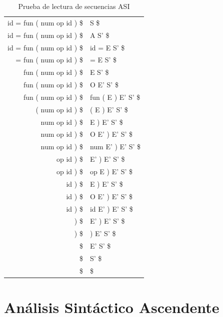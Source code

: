 \documentclass[12pt, twoside, openright]{report} %
\begin{document}
\begin{enumerate}
	      \begin{table}[H]
		      \centering
		      \begin{tabular}{r|l}
			      id = fun ( num op id ) \$ & S \$               \\
			      id = fun ( num op id ) \$ & A S' \$            \\
			      id = fun ( num op id ) \$ & id = E S' \$       \\
			      = fun ( num op id ) \$    & = E S' \$          \\
			      fun ( num op id ) \$      & E S' \$            \\
			      fun ( num op id ) \$      & O E' S' \$         \\
			      fun ( num op id ) \$      & fun ( E ) E' S' \$ \\
			      ( num op id ) \$          & ( E ) E' S' \$     \\
			      num op id ) \$            & E ) E' S' \$       \\
			      num op id ) \$            & O E' ) E' S' \$    \\
			      num op id ) \$            & num E' ) E' S' \$  \\
			      op id ) \$                & E' ) E' S' \$      \\
			      op id ) \$                & op E ) E' S' \$    \\
			      id ) \$                   & E ) E' S' \$       \\
			      id ) \$                   & O E' ) E' S' \$    \\
			      id ) \$                   & id E' ) E' S' \$   \\
			      ) \$                      & E' ) E' S' \$      \\
			      ) \$                      & ) E' S' \$         \\
			      \$                        & E' S' \$           \\
			      \$                        & S' \$              \\
			      \$                        & \$
		      \end{tabular}
		      \caption{Prueba de lectura de secuencias ASI}
	      \end{table}

\end{enumerate}
\pagebreak
\section{Análisis Sintáctico Ascendente}
\end{document}
